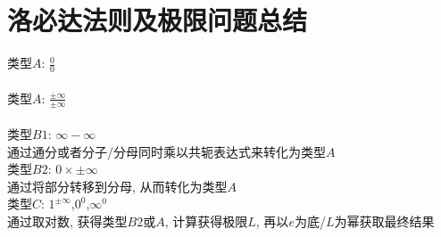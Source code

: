 \chapter{洛必达法则及极限问题总结}
类型$A$: $\displaystyle\frac{0}{0}$\\
\\

类型$A$: $\displaystyle\frac{\pm\infty}{\pm\infty}$\\
\\

类型$B1$: $\infty -\infty$\\
通过通分或者分子/分母同时乘以共轭表达式来转化为类型$A$\\

类型$B2$: $0\times\pm\infty$\\
通过将部分转移到分母, 从而转化为类型$A$\\

类型$C$: $1^{\pm\infty}$,$0^0$,$\infty^0$\\
通过取对数, 获得类型$B2$或$A$, 计算获得极限$L$, 再以$e$为底/$L$为幂获取最终结果
